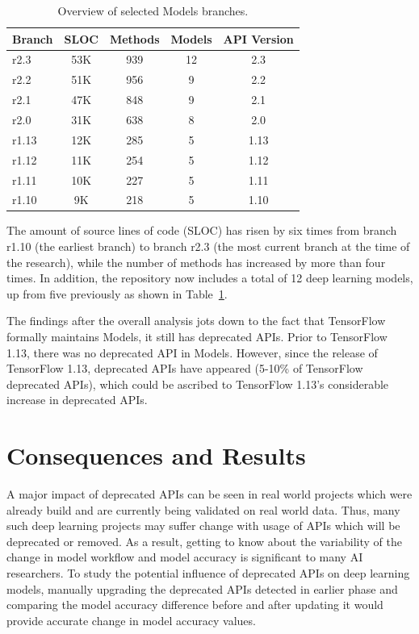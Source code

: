 \documentclass[12pt,letterpaper]{report}
\begin{document}
\begin{table}[h]
    \begin{center}
    \begin{tabular}{|l|c|c|c|c|}
    \hline
         Branch & SLOC & Methods & Models & API Version \\
    \hline\hline 
    r2.3 & 53K & 939 & 12 & 2.3 \\
    r2.2 & 51K & 956 & 9 & 2.2 \\
    r2.1 & 47K & 848 & 9 & 2.1 \\
    r2.0 & 31K & 638 & 8 & 2.0 \\
    r1.13 & 12K & 285 & 5 & 1.13 \\
    r1.12 & 11K & 254 & 5 & 1.12 \\
    r1.11 & 10K & 227 & 5 & 1.11 \\
    r1.10 & 9K & 218 & 5 & 1.10 \\
    \hline
    \end{tabular}
    \end{center}
    \caption{Overview of selected Models branches.\label{model_overview}}
 \end{table}

The amount of source lines of code (SLOC) has risen by six times from branch r1.10 (the earliest branch) to branch r2.3 (the most current branch at the time of the research), while the number of methods has increased by more than four times. In addition, the repository now includes a total of 12 deep learning models, up from five previously as shown in Table~\ref{model_overview}.

The findings after the overall analysis jots down to the fact that TensorFlow formally maintains Models, it still has deprecated APIs. Prior to TensorFlow 1.13, there was no deprecated API in Models. However, since the release of TensorFlow 1.13, deprecated APIs have appeared (5-10\% of TensorFlow deprecated APIs), which could be ascribed to TensorFlow 1.13's considerable increase in deprecated APIs. 

\newpage

\section{Consequences and Results} \label{sec:consequences}
A major impact of deprecated APIs can be seen in real world projects which were already build and are currently being validated on real world data. Thus, many such deep learning projects may suffer change with usage of APIs which will be deprecated or removed. As a result, getting to know about the variability of the change in model workflow and model accuracy is significant to many AI researchers. To study the potential influence of deprecated APIs on deep learning models, manually upgrading the deprecated APIs detected in earlier phase and comparing the model accuracy difference before and after updating it would provide accurate change in model accuracy values.
\end{document}
